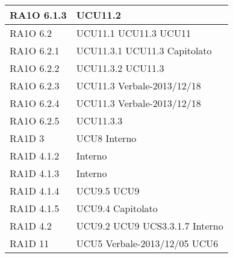\begin{center}
\begin{longtable}{ | p{5cm} | p{5cm} |}
        RA1O 6.1.3  &  UCU11.2 \newline  \\ \hline      
        RA1O 6.2  &  UCU11.1 \newline  UCU11.3 \newline  UCU11 \newline  \\ \hline      
        RA1O 6.2.1 &  UCU11.3.1 \newline  UCU11.3 \newline  Capitolato \newline  \\ \hline      
        RA1O 6.2.2 &  UCU11.3.2 \newline  UCU11.3 \newline  \\ \hline      
        RA1O 6.2.3 &  UCU11.3 \newline  Verbale-2013/12/18 \newline  \\ \hline      
        RA1O 6.2.4 &  UCU11.3 \newline  Verbale-2013/12/18 \newline  \\ \hline      
        RA1O 6.2.5 &  UCU11.3.3 \newline  \\ \hline      
        RA1D 3  &  UCU8 \newline  Interno \newline  \\ \hline      
        RA1D 4.1.2  &  Interno \newline  \\ \hline      
        RA1D 4.1.3  &  Interno \newline  \\ \hline      
        RA1D 4.1.4  &  UCU9.5 \newline  UCU9 \newline  \\ \hline      
        RA1D 4.1.5 &  UCU9.4 \newline  Capitolato \newline  \\ \hline      
        RA1D 4.2  &  UCU9.2 \newline  UCU9 \newline  UCS3.3.1.7 \newline  Interno \newline  \\ \hline      
        RA1D 11 &  UCU5 \newline  Verbale-2013/12/05 \newline  UCU6 \newline  \\ \hline      

\end{longtable}
\end{center}
